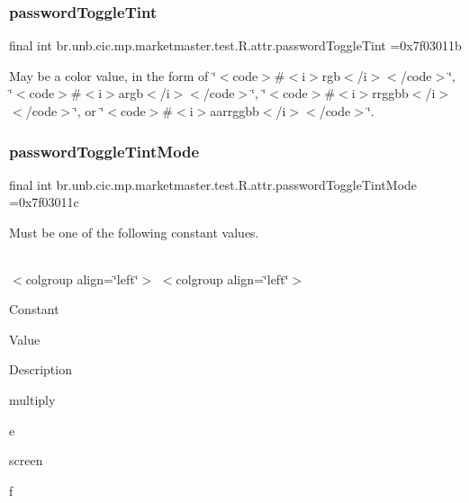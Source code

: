 \subsubsection{\texorpdfstring{password\+Toggle\+Tint}{passwordToggleTint}}
{\footnotesize\ttfamily final int br.\+unb.\+cic.\+mp.\+marketmaster.\+test.\+R.\+attr.\+password\+Toggle\+Tint =0x7f03011b\hspace{0.3cm}{\ttfamily [static]}}

May be a color value, in the form of \char`\"{}$<$code$>$\#$<$i$>$rgb$<$/i$>$$<$/code$>$\char`\"{}, \char`\"{}$<$code$>$\#$<$i$>$argb$<$/i$>$$<$/code$>$\char`\"{}, \char`\"{}$<$code$>$\#$<$i$>$rrggbb$<$/i$>$$<$/code$>$\char`\"{}, or \char`\"{}$<$code$>$\#$<$i$>$aarrggbb$<$/i$>$$<$/code$>$\char`\"{}. \mbox{\label{classbr_1_1unb_1_1cic_1_1mp_1_1marketmaster_1_1test_1_1R_1_1attr_a0441770c8888023cd7a3c26856f3b5b1}} 
\subsubsection{\texorpdfstring{password\+Toggle\+Tint\+Mode}{passwordToggleTintMode}}
{\footnotesize\ttfamily final int br.\+unb.\+cic.\+mp.\+marketmaster.\+test.\+R.\+attr.\+password\+Toggle\+Tint\+Mode =0x7f03011c\hspace{0.3cm}{\ttfamily [static]}}

Must be one of the following constant values.

\tabulinesep=1mm
\begin{longtabu} spread 0pt [c]{*{0}{|X[-1]}|}
\hline
\end{longtabu}
$<$colgroup align=\char`\"{}left\char`\"{}$>$ $<$colgroup align=\char`\"{}left\char`\"{}$>$ 

Constant

Value

Description 

multiply

e

screen

f

